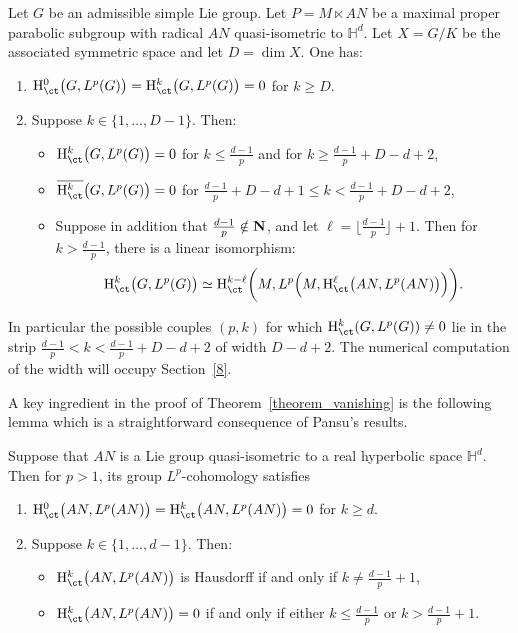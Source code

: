 \begin{theo}\label{theorem_vanishing}
Let $G$ be an admissible simple Lie group. Let $P = M \ltimes AN$ be a maximal proper parabolic subgroup with radical $AN$ quasi-isometric to $\mathbb H ^d$. Let $X = G/K$ be the associated symmetric space and let $D = \dim X$. One has:
\begin{enumerate}
\item ${\rm H}^0 _{\ct}\bigl(G, L^p(G) \bigr) = {\rm H}^k _{\ct}\bigl(G, L^p(G) \bigr) = 0$ for $k \geqslant D$.
\item Suppose $k \in \{1,\dots,D-1\}$. Then:
\begin{itemize}
\item ${\rm H}^k _{\ct}\bigl(G, L^p(G) \bigr) = 0$ for $k \leqslant \frac{d-1}{p}$ and for $k \geqslant \frac{d-1}{p} + D-d+2$,
\item $\overline{{\rm H}^k _{\ct}}\bigl(G, L^p(G) \bigr) =0$ for $\frac{d-1}{p} + D-d+1 \leqslant k < \frac{d-1}{p} + D-d+2$,
\item Suppose in addition that $\frac{d-1}{p} \notin {\bf N}$, and let $\ell = \lfloor \frac{d-1}{p} \rfloor +1$. Then for $k > \frac{d-1}{p}$, there is a linear isomorphism:
\[
{\rm H}_{\ct} ^k \bigl(G, L^p(G) \bigr) \simeq {\rm H}_{\ct} ^{k-\ell} \biggl(M, L^p\Bigl(M, {\rm H}^\ell _{\ct} \bigl(AN, L^p(AN)\bigr)\Bigr)\biggr).
\]
\end{itemize}
\end{enumerate}
\end{theo}

In particular the possible couples $(p,k)$ for which ${\rm H}^k _{\ct}(G, L^p(G)) \neq 0$ lie in the strip $\frac{d-1}{p} < k <\frac{d-1}{p} + D-d+2$ of width $D-d+2$. The numerical computation of the width will occupy Section~\ref{8}.

A key ingredient in the proof of Theorem~\ref{theorem_vanishing} is the following lemma which is a straightforward consequence of Pansu's results.

\begin{lemm}\label{prop_SL}
Suppose that $AN$ is a Lie group quasi-isometric to a real hyperbolic space $\mathbb H ^d$.
Then for $p>1$, its group $L^p$-cohomology satisfies
\begin{enumerate}
\item ${\rm H}^0 _{\ct} \bigl(AN, L^p(AN) \bigr) = {\rm H}^k _{\ct} \bigl(AN, L^p(AN)\bigr) = 0$ for $k \geqslant d$.
\item Suppose $k \in \{1,\dots,d-1\}$. Then:
\begin{itemize}
\item ${\rm H}^k _{\ct} \bigl(AN, L^p(AN)\bigr)$ is Hausdorff if and only if $k \neq \frac{d-1}{p} +1$,
\item ${\rm H}^k _{\ct} \bigl(AN, L^p(AN)\bigr) = 0$ if and only if either $k \leqslant \frac{d-1}{p}$ or $k > \frac{d-1}{p} + 1$.
\end{itemize}
\end{enumerate}
\end{lemm}



